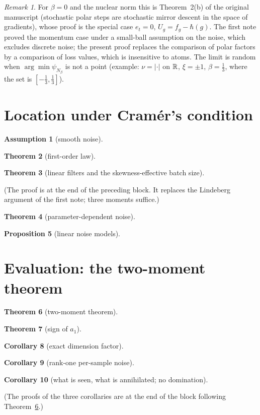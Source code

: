 \documentclass[10pt]{article}
\newtheorem{theorem}{Theorem}
\newtheorem{proposition}[theorem]{Proposition}
\newtheorem{corollary}[theorem]{Corollary}
\theoremstyle{definition}
\newtheorem{assumption}{Assumption}
\theoremstyle{remark}
\newtheorem{remark}[theorem]{Remark}
\begin{document}
\begin{remark}
For $\beta=0$ and the nuclear norm this is Theorem~2(b) of the original manuscript (stochastic polar steps are
stochastic mirror descent in the space of gradients), whose proof is the special case $e_t=0$, $U_g=f_g-\hbar(g)$. The
first note proved the momentum case under a small-ball assumption on the noise, which excludes discrete noise;
the present proof replaces the comparison of polar factors by a comparison of loss values, which is insensitive to
atoms. The limit is random when $\arg\min\psi_{N_\beta}$ is not a point (example: $\nu=|\cdot|$ on $\mathbb{R}$, $\xi=\pm1$,
$\beta=\frac13$, where the set is $[-\frac13,\frac13]$).
\end{remark}

\section{Location under Cram\'er's condition}\label{sec:cramer}

\begin{assumption}[smooth noise]\label{ass:N}\StmtAssN\end{assumption}
\begin{theorem}[first-order law]\label{thm:cf}\StmtCF\end{theorem}

\begin{theorem}[linear filters and the skewness-effective batch size]\label{thm:beff}\StmtBeff\end{theorem}
(The proof is at the end of the preceding block. It replaces the Lindeberg argument of the first note; three moments
suffice.)

\begin{theorem}[parameter-dependent noise]\label{thm:state}\StmtState\end{theorem}
\begin{proposition}[linear noise models]\label{prop:lin}\StmtLin\end{proposition}


\section{Evaluation: the two-moment theorem}\label{sec:two}

\begin{theorem}[two-moment theorem]\label{thm:two}\StmtTwo\end{theorem}

\begin{theorem}[sign of $a_1$]\label{thm:a1}\StmtAone\end{theorem}

\begin{corollary}[exact dimension factor]\label{cor:dim}\StmtDim\end{corollary}
\begin{corollary}[rank-one per-sample noise]\label{cor:rank1}\StmtRankOne\end{corollary}
\begin{corollary}[what is seen, what is annihilated; no domination]\label{cor:compare}\StmtCompare\end{corollary}
(The proofs of the three corollaries are at the end of the block following Theorem~\ref{thm:two}.)
\end{document}
